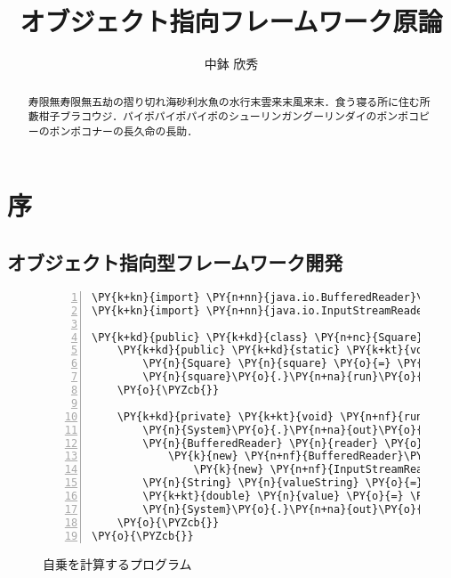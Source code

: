 \documentclass[a4j,papersize]{jsbook}
\title{オブジェクト指向フレームワーク原論}
\author{中鉢 欣秀}
\begin{document}
\maketitle


\chapter{序}
\begin{abstract}
寿限無寿限無五劫の摺り切れ海砂利水魚の水行末雲来末風来末．食う寝る所に住む所藪柑子ブラコウジ．パイポパイポパイポのシューリンガングーリンダイのポンポコピーのポンポコナーの長久命の長助．
\end{abstract}
\section{オブジェクト指向型フレームワーク開発}

\begin{figure}
\begin{Verbatim}[commandchars=\\\{\},numbers=left,firstnumber=1,stepnumber=1,
	frame=single,fontsize=\small]
\PY{k+kn}{import} \PY{n+nn}{java.io.BufferedReader}\PY{o}{;}
\PY{k+kn}{import} \PY{n+nn}{java.io.InputStreamReader}\PY{o}{;}

\PY{k+kd}{public} \PY{k+kd}{class} \PY{n+nc}{Square} \PY{o}{\PYZob{}}
	\PY{k+kd}{public} \PY{k+kd}{static} \PY{k+kt}{void} \PY{n+nf}{main}\PY{o}{(}\PY{n}{String}\PY{o}{[}\PY{o}{]} \PY{n}{args}\PY{o}{)} \PY{k+kd}{throws} \PY{n}{Exception} \PY{o}{\PYZob{}}
		\PY{n}{Square} \PY{n}{square} \PY{o}{=} \PY{k}{new} \PY{n}{Square}\PY{o}{(}\PY{o}{)}\PY{o}{;}
		\PY{n}{square}\PY{o}{.}\PY{n+na}{run}\PY{o}{(}\PY{o}{)}\PY{o}{;}
	\PY{o}{\PYZcb{}}

	\PY{k+kd}{private} \PY{k+kt}{void} \PY{n+nf}{run}\PY{o}{(}\PY{o}{)} \PY{k+kd}{throws} \PY{n}{Exception} \PY{o}{\PYZob{}}
		\PY{n}{System}\PY{o}{.}\PY{n+na}{out}\PY{o}{.}\PY{n+na}{print}\PY{o}{(}\PY{l+s}{"自乗を計算する値を入力してください："}\PY{o}{)}\PY{o}{;}
		\PY{n}{BufferedReader} \PY{n}{reader} \PY{o}{=}
			\PY{k}{new} \PY{n+nf}{BufferedReader}\PY{o}{(}
				\PY{k}{new} \PY{n+nf}{InputStreamReader}\PY{o}{(}\PY{n}{System}\PY{o}{.}\PY{n+na}{in}\PY{o}{)}\PY{o}{)}\PY{o}{;}
		\PY{n}{String} \PY{n}{valueString} \PY{o}{=} \PY{n}{reader}\PY{o}{.}\PY{n+na}{readLine}\PY{o}{(}\PY{o}{)}\PY{o}{;}
		\PY{k+kt}{double} \PY{n}{value} \PY{o}{=} \PY{n}{Double}\PY{o}{.}\PY{n+na}{parseDouble}\PY{o}{(}\PY{n}{valueString}\PY{o}{)}\PY{o}{;}
		\PY{n}{System}\PY{o}{.}\PY{n+na}{out}\PY{o}{.}\PY{n+na}{println}\PY{o}{(}\PY{l+s}{"計算結果："} \PY{o}{+} \PY{o}{(}\PY{n}{value} \PY{o}{*} \PY{n}{value}\PY{o}{)}\PY{o}{)}\PY{o}{;}
	\PY{o}{\PYZcb{}}
\PY{o}{\PYZcb{}}
\end{Verbatim}
\caption{自乗を計算するプログラム} 
\end{figure}
\end{document}
